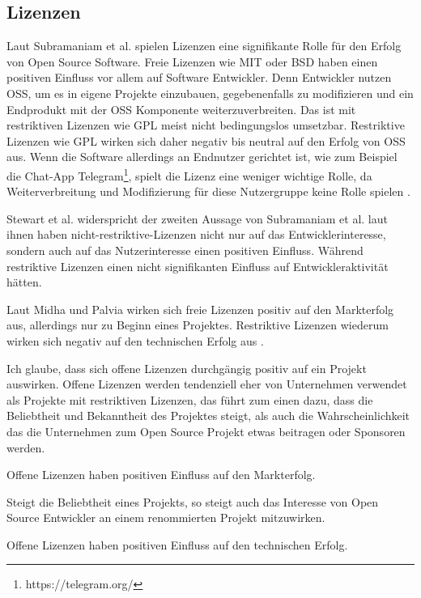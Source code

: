 \subsection{Lizenzen}

Laut Subramaniam et al. spielen Lizenzen eine signifikante Rolle für den Erfolg von 
Open Source Software.
Freie Lizenzen wie MIT oder BSD haben einen positiven Einfluss vor allem auf Software Entwickler.
Denn Entwickler nutzen OSS, um es in eigene Projekte einzubauen, gegebenenfalls zu modifizieren
und ein Endprodukt mit der OSS Komponente weiterzuverbreiten. Das ist mit restriktiven Lizenzen 
wie GPL meist nicht bedingungslos umsetzbar. Restriktive Lizenzen wie GPL wirken sich daher 
negativ bis neutral auf den Erfolg von OSS aus. Wenn die Software allerdings an Endnutzer
gerichtet ist, wie zum Beispiel die Chat-App Telegram\footnote{https://telegram.org/}, spielt die
Lizenz eine weniger wichtige Rolle, da Weiterverbreitung und Modifizierung für diese Nutzergruppe 
keine Rolle spielen \cite{subramaniamDeterminantsOpenSource2009}.

Stewart et al. widerspricht der zweiten Aussage von Subramaniam et al. laut ihnen
haben nicht-restriktive-Lizenzen nicht nur auf das Entwicklerinteresse, sondern auch auf das 
Nutzerinteresse einen positiven Einfluss. %
Während restriktive Lizenzen einen nicht signifikanten Einfluss auf
Entwickleraktivität hätten. \cite{stewartImpactsLicenseChoice2006a}

Laut Midha und Palvia wirken sich freie Lizenzen positiv auf den Markterfolg aus, allerdings
nur zu Beginn eines Projektes. %
Restriktive Lizenzen wiederum wirken sich negativ auf den technischen Erfolg aus %
\cite{midhaFactorsAffectingSuccess2012}.


Ich glaube, dass sich offene Lizenzen durchgängig positiv auf ein Projekt auswirken. 
Offene Lizenzen werden tendenziell eher von Unternehmen verwendet als Projekte mit restriktiven
Lizenzen, das führt zum einen dazu, dass die Beliebtheit und Bekanntheit des Projektes steigt, als
auch die Wahrscheinlichkeit das die Unternehmen zum Open Source Projekt etwas beitragen oder 
Sponsoren werden.

\begin{hypothesis}
    Offene Lizenzen haben positiven Einfluss auf den Markterfolg.
\end{hypothesis}

\noindent
Steigt die Beliebtheit eines Projekts, so steigt auch das Interesse von Open Source Entwickler an 
einem renommierten Projekt mitzuwirken.

\begin{hypothesis}
    Offene Lizenzen haben positiven Einfluss auf den technischen Erfolg.
\end{hypothesis}
